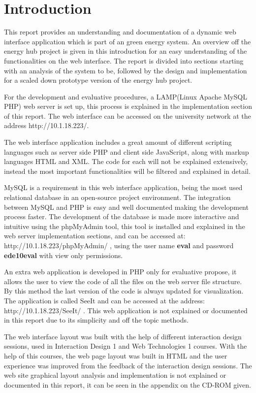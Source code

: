 \section{Introduction}
This report provides an understanding and documentation of a dynamic web interface application which is part of an green energy system. An overview off the energy hub project is given in this introduction for an easy understanding of the functionalities on the web interface. The report is divided into sections starting with an analysis of the system to be, followed by the design and implementation for a scaled down prototype version of the energy hub project. 

For the development and evaluative procedures, a LAMP(Linux Apache MySQL PHP) web server is set up, this process is explained in the implementation section of this report. The web interface can be accessed on the university network at the address http://10.1.18.223/.

The web interface application includes a great amount of different scripting languages such as server side PHP and client side JavaScript, along with markup languages HTML and XML. The code for each will not be explained extensively, instead the most important functionalities will be filtered and explained in detail.

MySQL is a requirement in this web interface application, being the most used relational database in an open-source project environment. The integration between MySQL and PHP is easy and well documented making the development process faster. The development of the database is made more interactive and intuitive using the phpMyAdmin tool, this tool is installed and explained in the web server implementation sections, and can be accessed at: http://10.1.18.223/phpMyAdmin/ , using the user name \textbf{eval} and password \textbf{ede10eval} with view only permissions.

An extra web application is developed in PHP only for evaluative propose, it allows the user to view the code of all the files on the web server file structure. By this method the last version of the code is always updated for visualization. The application is called SeeIt and can be accessed at the address: http://10.1.18.223/SeeIt/ . This web application is not explained or documented in this report due to its simplicity and off the topic methods.

The web interface layout was built with the help of different interaction design sessions, used in Interaction Design 1 and Web Technologies 1 courses. With the help of this courses, the web page layout was built in HTML and the user experience was improved from the feedback of the interaction design sessions. The web site graphical layout analysis and implementation is not explained or documented in this report, it can be seen in the appendix on the CD-ROM given.

